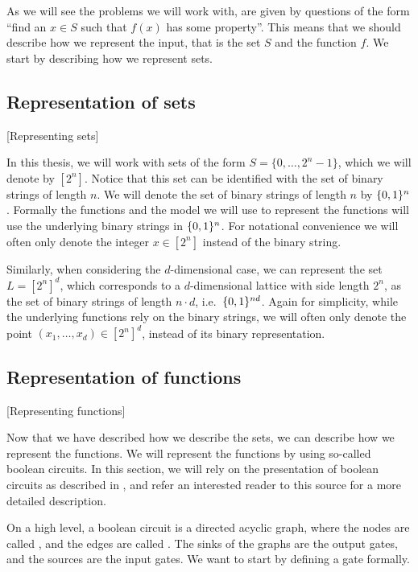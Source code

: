 As we will see the problems we will work with, are given by questions of the form ``find an $x \in S$ such that $f(x)$ has some property''. This means that we should describe how we represent the input, that is the set $S$ and the function $f$. We start by describing how we represent sets.

\subsection{Representation of sets}[Representing sets]

In this thesis, we will work with sets of the form $S = \{0, \dots, 2^n - 1\}$, which we will denote by $[2^n]$. Notice that this set can be identified with the set of binary strings of length $n$. We will denote the set of binary strings of length $n$ by $\{0, 1\}^n$. Formally the functions and the model we will use to represent the functions will use the underlying binary strings in $\{0, 1\}^n$. For notational convenience we will often only denote the integer $x \in [2^n]$ instead of the binary string.

Similarly, when considering the $d$-dimensional case, we can represent the set $L = [2^n]^d$, which corresponds to a $d$-dimensional lattice with side length $2^n$, as the set of binary strings of length $n \cdot d$, i.e.\ $\{0, 1\}^{nd}$. Again for simplicity, while the underlying functions rely on the binary strings, we will often only denote the point $(x_1, \dots, x_d) \in [2^n]^d$, instead of its binary representation.

\subsection{Representation of functions}[Representing functions]

Now that we have described how we describe the sets, we can describe how we represent the functions. We will represent the functions by using so-called boolean circuits. In this section, we will rely on the presentation of boolean circuits as described in , and refer an interested reader to this source for a more detailed description.

On a high level, a boolean circuit is a directed acyclic graph, where the nodes are called , and the edges are called . The sinks of the graphs are the output gates, and the sources are the input gates. We want to start by defining a gate formally.

